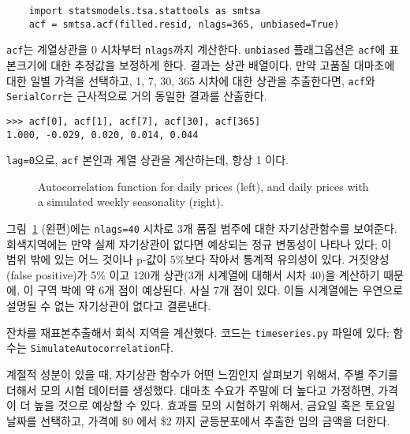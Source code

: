 \begin{verbatim}
    import statsmodels.tsa.stattools as smtsa
    acf = smtsa.acf(filled.resid, nlags=365, unbiased=True)
\end{verbatim}

{\tt acf}는 계열상관을 0 시차부터 {\tt nlags}까지 계산한다.
{\tt unbiased} 플래그옵션은 {\tt acf}에 표본크기에 대한 추정값을 보정하게 한다. 결과는 상관 배열이다. 만약 고품질 대마초에 대한 일별 가격을 선택하고, 1, 7, 30, 365 시차에 대한 상관을 추출한다면, 
{\tt acf}와 {\tt SerialCorr}는 근사적으로 거의 동일한 결과를 산출한다.

\begin{verbatim}
>>> acf[0], acf[1], acf[7], acf[30], acf[365]
1.000, -0.029, 0.020, 0.014, 0.044
\end{verbatim}

{\tt lag=0}으로, {\tt acf} 본인과 계열 상관을 계산하는데, 항상 1 이다.

\begin{figure}
\caption{Autocorrelation function for daily prices (left), and
daily prices with a simulated weekly seasonality (right).}
\label{timeseries9}
\end{figure}

그림~\ref{timeseries9} (왼편)에는 {\tt nlags=40} 시차로 3개 품질 범주에 대한 자기상관함수를 보여준다.
회색지역에는 만약 실제 자기상관이 없다면 예상되는 정규 변동성이 나타나 있다; 이 범위 밖에 있는 어느 것이나 p-값이 5\%보다 작아서 통계적 유의성이 있다. 거짓양성(false positive)가 5\% 이고 120개 상관(3개 시계열에 대해서 시차 40)을 계산하기 때문에, 이 구역 박에 약 6개 점이 예상된다.
사실 7개 점이 있다. 이들 시계열에는 우연으로 설명될 수 없는 자기상관이 없다고 결론낸다.

잔차를 재표본추출해서 회식 지역을 계산했다. 코드는 {\tt timeseries.py} 파일에 있다; 함수는 {\tt SimulateAutocorrelation}다.

계절적 성분이 있을 때, 자기상관 함수가 어떤 느낌인지 살펴보기 위해서, 주별 주기를 더해서 모의 시험 데이터를 생성했다. 대마초 수요가 주말에 더 높다고 가정하면, 가격이 더 높을 것으로 예상할 수 있다. 효과를 모의 시험하기 위해서, 금요일 혹은 토요일 날짜를 선택하고, 가격에 \$0 에서 \$2 까지 균등분포에서 추출한 임의 금액을 더한다.

